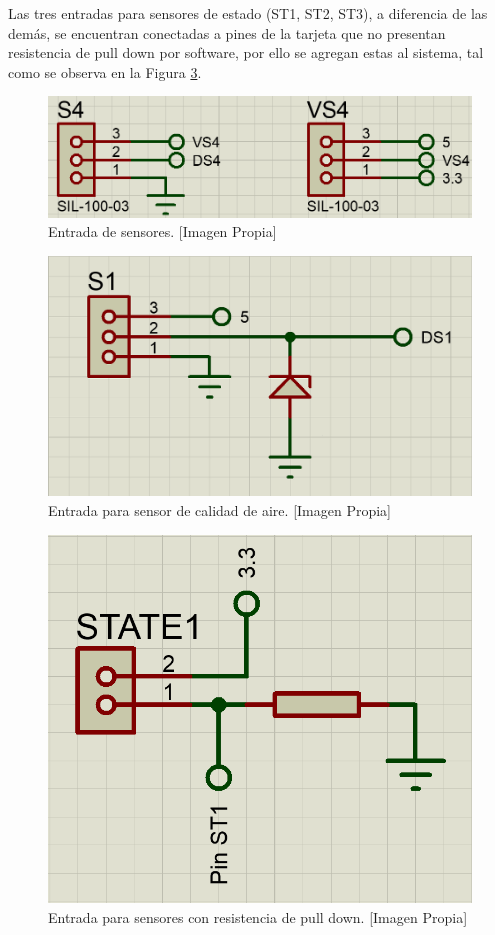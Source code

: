 		Las tres entradas para sensores de estado (ST1, ST2, ST3), a diferencia de las demás, se encuentran conectadas a pines de la tarjeta que no presentan resistencia de pull down por software, por ello se agregan estas al sistema, tal como se observa en la Figura \ref{fig:ST}.\\
		
		\begin{figure}[H]
			\centering
			\caption[Entrada de sensores.]{Entrada de sensores. [Imagen Propia]}
			\label{fig:SVS}
			\includegraphics[width=0.7\linewidth]{Imagenes/SVS}
		\end{figure}
	
		\begin{figure}[H]
			\centering
			\caption[Entrada para sensor de calidad de aire.]{Entrada para sensor de calidad de aire. [Imagen Propia]}
			\label{fig:S1Aire}
			\includegraphics[width=0.6\linewidth]{Imagenes/S1Aire}
		\end{figure}
	
		\begin{figure}[H]
			\centering
			\caption[Entrada para sensores con resistencia de pull down.]{Entrada para sensores con resistencia de pull down. [Imagen Propia]}
			\label{fig:ST}
			\includegraphics[width=0.5\linewidth]{Imagenes/ST}
		\end{figure}		
	
